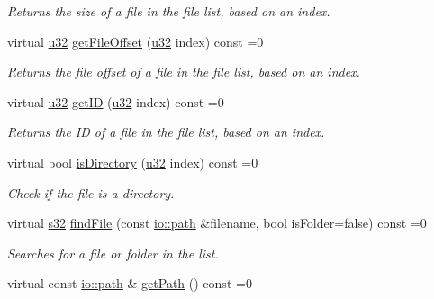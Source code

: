 \begin{DoxyCompactItemize}
\begin{DoxyCompactList}\small\item\em Returns the size of a file in the file list, based on an index. \end{DoxyCompactList}\item 
virtual \hyperlink{namespaceirr_a0416a53257075833e7002efd0a18e804}{u32} \hyperlink{classirr_1_1io_1_1IFileList_a97582a2cf5c05e7b8dcb702384ab76bd}{get\+File\+Offset} (\hyperlink{namespaceirr_a0416a53257075833e7002efd0a18e804}{u32} index) const =0
\begin{DoxyCompactList}\small\item\em Returns the file offset of a file in the file list, based on an index. \end{DoxyCompactList}\item 
virtual \hyperlink{namespaceirr_a0416a53257075833e7002efd0a18e804}{u32} \hyperlink{classirr_1_1io_1_1IFileList_a9f633344aa2bb36f619d1ca8472b46b6}{get\+ID} (\hyperlink{namespaceirr_a0416a53257075833e7002efd0a18e804}{u32} index) const =0
\begin{DoxyCompactList}\small\item\em Returns the ID of a file in the file list, based on an index. \end{DoxyCompactList}\item 
virtual bool \hyperlink{classirr_1_1io_1_1IFileList_a0f2cb8c99e9ecc4b56d08718c885a5af}{is\+Directory} (\hyperlink{namespaceirr_a0416a53257075833e7002efd0a18e804}{u32} index) const =0
\begin{DoxyCompactList}\small\item\em Check if the file is a directory. \end{DoxyCompactList}\item 
virtual \hyperlink{namespaceirr_ac66849b7a6ed16e30ebede579f9b47c6}{s32} \hyperlink{classirr_1_1io_1_1IFileList_a2b0fce45cbea72f5c6dc13eb85183054}{find\+File} (const \hyperlink{namespaceirr_1_1io_a6468281622ce3a1c46b72e19f32dded5}{io\+::path} \&filename, bool is\+Folder=false) const =0
\begin{DoxyCompactList}\small\item\em Searches for a file or folder in the list. \end{DoxyCompactList}\item 
\mbox{\label{classirr_1_1io_1_1IFileList_ac3473e66ba9c3cee2e06c1fb46493e88}} 
virtual const \hyperlink{namespaceirr_1_1io_a6468281622ce3a1c46b72e19f32dded5}{io\+::path} \& \hyperlink{classirr_1_1io_1_1IFileList_ac3473e66ba9c3cee2e06c1fb46493e88}{get\+Path} () const =0

\end{DoxyCompactItemize}
